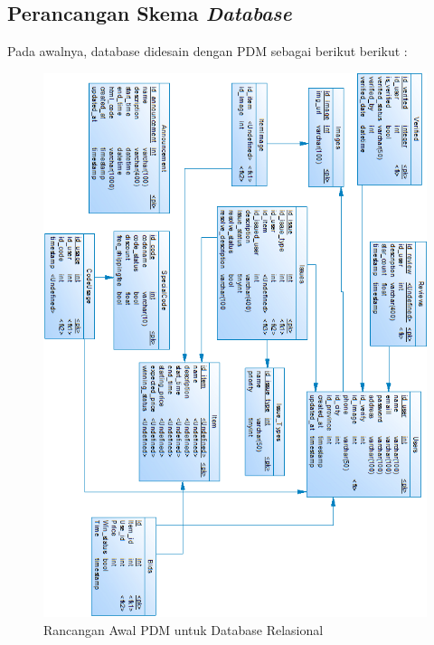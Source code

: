 \subsection{Perancangan Skema \textit{Database}}

	Pada awalnya, database didesain dengan PDM sebagai berikut berikut : 
	
	\begin{figure}[H]
		\centering
		\includegraphics[height=0.6\paperheight]{images/bab3/db/pdm-awal.png}
		\caption{Rancangan Awal PDM untuk Database Relasional}
		\label{pdm-awal}
	\end{figure}
	
